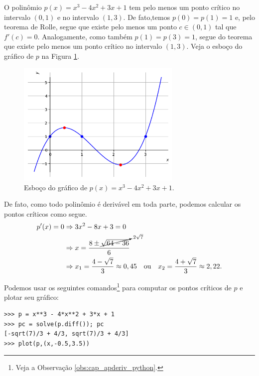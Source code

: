 \begin{ex}
  O polinômio $p(x) = x^3 - 4x^2 + 3x + 1$ tem pelo menos um ponto crítico no intervalo $(0,1)$ e no intervalo $(1,3)$. De fato,temos $p(0)=p(1)=1$ e, pelo teorema de Rolle, segue que existe pelo menos um ponto $c\in (0, 1)$ tal que $f'(c)=0$. Analogamente, como também $p(1)=p(3)=1$, segue do teorema que existe pelo menos um ponto crítico no intervalo $(1,3)$. Veja o esboço do gráfico de $p$ na Figura \ref{fig:ex_teo_Rolle}.

  \begin{figure}[H]
    \centering
    \includegraphics[width=0.7\textwidth]{./cap_apderiv/dados/fig_ex_teo_Rolle/fig_ex_teo_Rolle}
    \caption{Esboço do gráfico de $p(x) = x^3 - 4x^2 + 3x + 1$.}
    \label{fig:ex_teo_Rolle}
  \end{figure}
  
  De fato, como todo polinômio é derivável em toda parte, podemos calcular os pontos críticos como segue.
  \begin{align}
    p'(x) = 0 &\Rightarrow 3x^2 - 8x + 3 = 0 \\
              &\Rightarrow x = \frac{8 \pm \cancelto{2\sqrt{7}}{\sqrt{64 - 36}}}{6} \\
              &\Rightarrow x_1 = \frac{4 - \sqrt{7}}{3} \approx 0,45 \quad\text{ou}\quad x_2 = \frac{4 + \sqrt{7}}{3} \approx 2,22.
  \end{align}

  \ifispython
  Podemos usar os seguintes comandos\footnote{Veja a Observação \ref{obs:cap_apderiv_python}.} para computar os pontos críticos de $p$ e plotar seu gráfico:
\begin{verbatim}
>>> p = x**3 - 4*x**2 + 3*x + 1
>>> pc = solve(p.diff()); pc
[-sqrt(7)/3 + 4/3, sqrt(7)/3 + 4/3]
>>> plot(p,(x,-0.5,3.5))
\end{verbatim}
  \fi
\end{ex}

